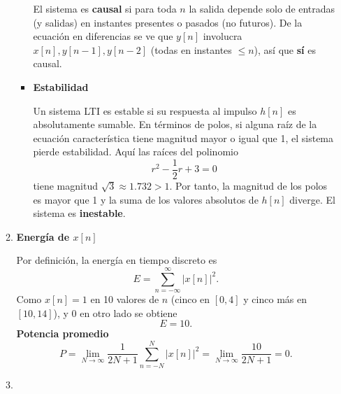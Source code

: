 \begin{enumerate}[label=\color{red}\textbf{\arabic*)}]
\begin{enumerate}[label=\color{red}\textbf{\alph*)}]
\begin{itemize}[label=\textbullet]
                El sistema es \textbf{causal} si para toda $n$ la salida depende solo de entradas (y salidas) en instantes presentes o pasados (no futuros). De la ecuación en diferencias se ve que $y[n]$ involucra  $x[n],y[n-1],y[n-2]$ (todas en instantes $\le n$), así que \textbf{sí} es causal.
            \item \textbf{Estabilidad}

                Un sistema LTI es estable si su respuesta al impulso $h[n]$ es absolutamente sumable. En términos de polos, si alguna raíz de la ecuación característica tiene magnitud mayor o igual que 1, el sistema pierde estabilidad. Aquí las raíces del polinomio  \[
                r^2-\dfrac{1}{2}r+3=0
            \] tiene magnitud $\sqrt{3}\approx 1.732>1$. Por tanto, la magnitud de los polos es mayor que 1 y la suma de los valores absolutos de $h[n]$ diverge. El sistema es  \textbf{inestable}.
            \end{itemize}

        \item {}

            \begin{center}
            \end{center}
            \textbf{Energía de $x[n]$} 

            Por definición, la energía en tiempo discreto es \[
                E=\sum_{n=-\infty}^{\infty} |x[n]|^2.
            \] 
            Como $ x[n]=1$ en 10 valores de $n$ (cinco en $[0,4]$ y cinco más en  $[10,14]$), y 0 en otro lado se obtiene \[
            E=10.
            \] 
            \textbf{Potencia promedio}
\[
    P=\lim_{N \to \infty} \dfrac{1}{2N+1}\sum_{n=-N}^{N} |x[n]|^2=\lim_{N \to \infty} \dfrac{10}{2N+1}=0.
\] 
        \item {} 


\end{enumerate}
\end{enumerate}
